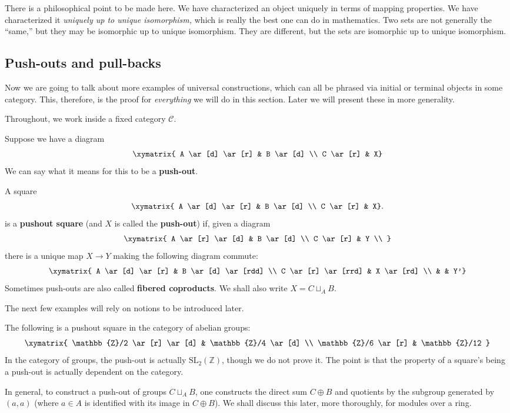 There is a philosophical point to be made here. We have characterized an object
uniquely in terms of mapping properties. We have characterized it
\emph{uniquely up to unique isomorphism,} which is really the best one can do
in mathematics. Two sets are not generally the ``same,'' but they may be
isomorphic up to unique isomorphism. They are different,
but the sets are isomorphic up
to unique isomorphism.

\subsection{Push-outs and pull-backs}

Now we are going to talk about more  examples of universal constructions, which can all be
phrased via initial or terminal objects in some category. This,
therefore, is the proof for \emph{everything} we will do in this
section. Later we will present these in more generality.

Throughout, we work inside a fixed category $\mathcal{C}$.

Suppose we have a diagram
\[
\xymatrix{
A \ar[d] \ar[r] &  B \ar[d] \\
C \ar[r] &  X}
\]
We can say what it means for this to be a \textbf{push-out}.

\begin{definition}
A square 
\[
\xymatrix{
A \ar[d] \ar[r] &  B \ar[d] \\
C \ar[r] &  X}.
\]
is a \textbf{pushout square} (and $X$ is called the \textbf{push-out}) if,
given a diagram
\[ \xymatrix{
A \ar[r] \ar[d]  &  B \ar[d] \\
C \ar[r] & Y  \\
}\]
there is a unique map $X \to Y$ making the following diagram commute:
\[
\xymatrix{
A \ar[d] \ar[r] &  B \ar[d] \ar[rdd] \\
C \ar[r] \ar[rrd] &  X \ar[rd] \\
& & Y'}
\]
Sometimes push-outs are also called \textbf{fibered coproducts}.
We shall also write $X = C \sqcup_A B$.
\end{definition}


The next few examples will rely on notions to be introduced later.
\begin{example}
The following is a pushout square in the category of abelian groups:
\[ \xymatrix{
\mathbb{Z}/2 \ar[r] \ar[d]  &  \mathbb{Z}/4 \ar[d]  \\
\mathbb{Z}/6 \ar[r] &  \mathbb{Z}/12
}\]
In the category of groups, the push-out is actually
$\mathrm{SL}_2(\mathbb{Z})$, though we do not prove it. The point is that
the property of a square's being a
push-out is actually dependent on the category.

In general, to construct a push-out of groups $C \sqcup_A B$, one constructs
the direct sum $C \oplus B$ and quotients by the subgroup generated by
$(a, a)$ (where $a \in A$ is identified with its image in $C \oplus B$).
We shall discuss this later, more thoroughly, for modules over a ring.
\end{example}

